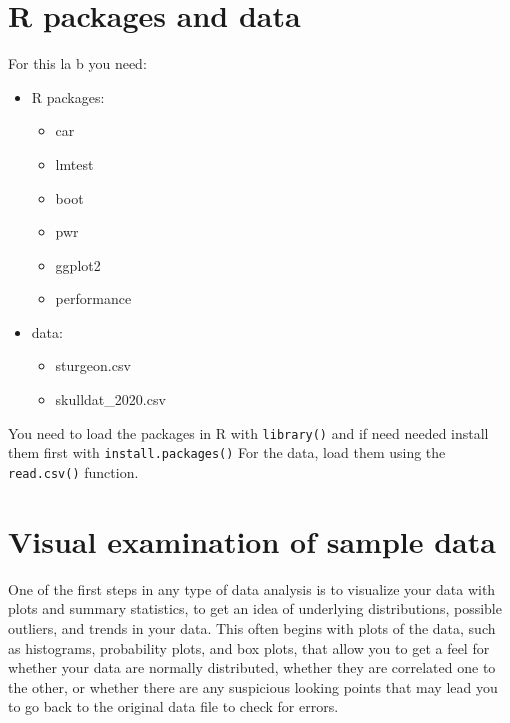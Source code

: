\documentclass[
  12pt,
]{book}
\providecommand{\tightlist}{%
  \setlength{\itemsep}{0pt}\setlength{\parskip}{0pt}}
\begin{document}
\hypertarget{set-ttest}{%
\section{R packages and data}\label{set-ttest}}

For this la b you need:

\begin{itemize}
\tightlist
\item
  R packages:

  \begin{itemize}
  \tightlist
  \item
    car
  \item
    lmtest
  \item
    boot
  \item
    pwr
  \item
    ggplot2
  \item
    performance
  \end{itemize}
\item
  data:

  \begin{itemize}
  \tightlist
  \item
    sturgeon.csv
  \item
    skulldat\_2020.csv
  \end{itemize}
\end{itemize}

You need to load the packages in R with \texttt{library()} and if need needed install them first with \texttt{install.packages()}
For the data, load them using the \texttt{read.csv()} function.

\hypertarget{visual-examination-of-sample-data}{%
\section{Visual examination of sample data}\label{visual-examination-of-sample-data}}

One of the first steps in any type of data analysis is to visualize your data with plots and summary statistics, to get an idea of underlying distributions, possible outliers, and trends in your data. This often begins with plots of the data, such as histograms, probability plots, and box plots, that allow you to get a feel for whether your data are normally distributed, whether they are correlated one to the other, or whether there are any suspicious looking points that may lead you to go back to the original data file to check for errors.
\end{document}
